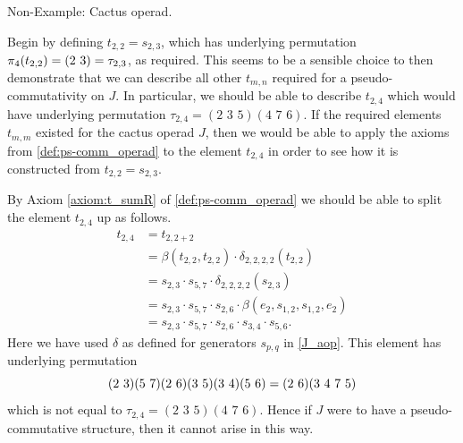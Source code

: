 \begin{example}
Non-Example: Cactus operad.

Begin by defining $t_{2,2} = s_{2,3}$, which has underlying permutation $\pi_4(t_{2,2}) = ( 2 \, \, 3 ) = \tau_{2,3}$, as required. This seems to be a sensible choice to then demonstrate that we can describe all other $t_{m,n}$ required for a pseudo-commutativity on $J$. In particular, we should be able to describe $t_{2,4}$ which would have underlying permutation $\tau_{2,4} = (2 \,\, 3 \,\, 5)(4 \,\, 7 \,\, 6)$. If the required elements $t_{m,m}$ existed for the cactus operad $J$, then we would be able to apply the axioms from \cref{def:ps-comm_operad} to the element $t_{2,4}$ in order to see how it is constructed from $t_{2,2} = s_{2,3}$.

By Axiom \ref{axiom:t_sumR} of \cref{def:ps-comm_operad} we should be able to split the element $t_{2,4}$ up as follows.
  \begin{align*}
    t_{2,4} &= t_{2,2+2} \\
    &= \beta(t_{2,2},t_{2,2}) \cdot \delta_{2,2,2,2}(t_{2,2}) \\
    &= s_{2,3} \cdot s_{5,7} \cdot \delta_{2,2,2,2}(s_{2,3}) \\
    &= s_{2,3} \cdot s_{5,7} \cdot s_{2,6} \cdot \beta(e_2,s_{1,2},s_{1,2},e_2) \\
    &= s_{2,3} \cdot s_{5,7} \cdot s_{2,6} \cdot s_{3,4} \cdot s_{5,6}.
  \end{align*}
Here we have used $\delta$ as defined for generators $s_{p,q}$ in \cref{J_aop}. This element has underlying permutation
  \[
      ( 2 \, \, 3 )( 5 \, \, 7 )( 2 \, \, 6 )( 3 \, \, 5 )( 3 \, \, 4 )( 5 \, \, 6 ) = ( 2 \, \, 6 )(3 \,\, 4 \,\, 7 \,\,5)
  \]
which is not equal to $\tau_{2,4} = (2 \,\, 3 \,\, 5)(4 \,\, 7 \,\, 6)$. Hence if $J$ were to have a pseudo-commutative structure, then it cannot arise in this way.
\end{example}


